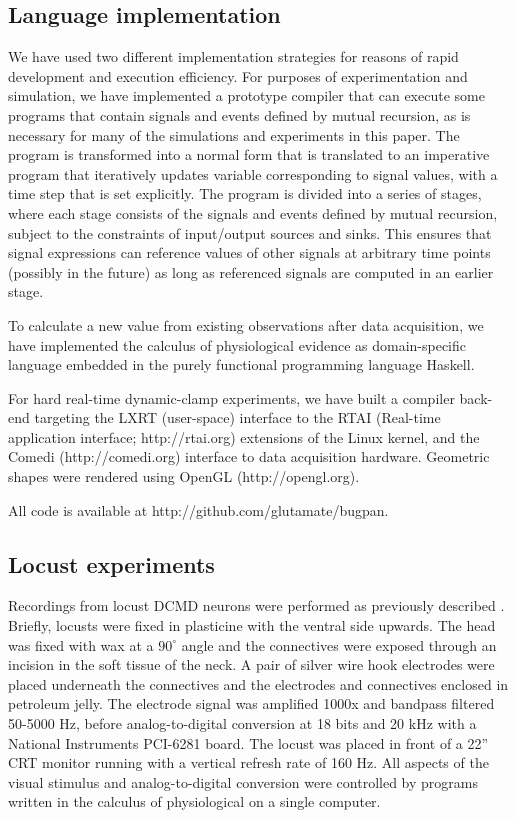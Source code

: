 \subsection*{Language implementation} 

We have used two different implementation strategies for reasons of
rapid development and execution efficiency. For purposes of
experimentation and simulation, we have implemented a prototype
compiler that can execute some programs that contain signals and
events defined by mutual recursion, as is necessary for many of the
simulations and experiments in this paper. The program is transformed
into a normal form that is translated to an imperative
program that iteratively updates variable corresponding to signal
values, with a time step that is set explicitly. The program is divided
into a series of stages, where each stage consists of the signals and
events defined by mutual recursion, subject to the constraints of
input/output sources and sinks. This ensures that signal expressions
can reference values of other signals at arbitrary time points
(possibly in the future) as long as referenced signals are computed in
an earlier stage.

To calculate a new value from existing observations after data
acquisition, we have implemented the calculus of physiological
evidence as domain-specific language embedded in the purely functional
programming language Haskell. 

For hard real-time dynamic-clamp experiments, we have built a compiler
back-end targeting the LXRT (user-space) interface to the RTAI (Real-time
application interface; http://rtai.org) extensions of the Linux
kernel, and the Comedi (http://comedi.org) interface to data
acquisition hardware. Geometric shapes were rendered using OpenGL
(http://opengl.org).

All code is available at http://github.com/glutamate/bugpan.

\subsection*{Locust experiments}

Recordings from locust DCMD neurons were performed as previously
described \citep{Matheson2004}. Briefly, locusts were fixed in
plasticine with the ventral side upwards. The head was fixed with wax
at a $90^{\circ}$ angle and the connectives were exposed through an
incision in the soft tissue of the neck. A pair of silver wire hook
electrodes were placed underneath the connectives and the electrodes
and connectives enclosed in petroleum jelly. The electrode signal was
amplified 1000x and bandpass filtered 50-5000 Hz, before
analog-to-digital conversion at 18 bits and 20 kHz with a National
Instruments PCI-6281 board. The locust was placed in front of a 22''
CRT monitor running with a vertical refresh rate of 160 Hz. All
aspects of the visual stimulus and analog-to-digital conversion were
controlled by programs written in the calculus of physiological on a
single computer.

